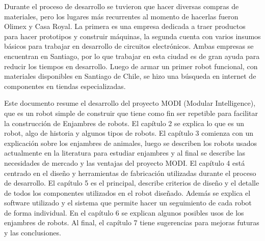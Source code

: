Durante el proceso de desarrollo se tuvieron que hacer diversas compras de materiales, pero los lugares más recurrentes al momento de hacerlas fueron Olimex y Casa Royal. La primera es una empresa dedicada a traer productos para hacer prototipos y construir máquinas, la segunda cuenta con varios insumos básicos para trabajar en desarrollo de circuitos electrónicos. Ambas empresas se encuentran en Santiago, por lo que trabajar en esta ciudad es de gran ayuda para reducir los tiempos en desarrollo.
Luego de armar un primer robot funcional, con materiales disponibles en Santiago de Chile, se hizo una búsqueda en internet de componentes en tiendas especializadas.

Este documento resume el desarrollo del proyecto MODI (Modular Intelligence), que es un robot simple de construir que tiene como fin ser repetible para facilitar la construcción de Enjambres de robots. El capítulo 2 se explica lo que es un robot, algo de historia y algunos tipos de robots. El capítulo 3 comienza con un explicación sobre los enjambres de animales, luego se describen los robots usados actualmente en la literatura para estudiar enjambres y al final se describe las necesidades de mercado y las ventajas del proyecto MODI. El capítulo 4 está centrado en el diseño y herramientas de fabricación utilizadas durante el proceso de desarrollo. El capítulo 5 es el principal, describe criterios de diseño y el detalle de todos los componentes utilizados en el robot diseñado. Además se explica el software utilizado y el sistema que permite hacer un seguimiento de cada robot de forma individual. En el capítulo 6 se explican algunos posibles usos de los enjambres de robots. Al final, el capítulo 7 tiene sugerencias para mejoras futuras y las conclusiones.

